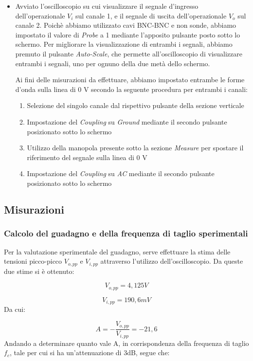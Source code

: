 \begin{itemize}
    \item Avviato l'oscilloscopio su cui visualizzare il segnale d'ingresso dell'operazionale $V_i$ sul canale 1, e il segnale di uscita dell'operazionale $V_o$ sul canale 2.
    Poichè abbiamo utilizzato cavi BNC-BNC e non sonde, abbiamo impostato il valore di \emph{Probe} a 1 mediante l'apposito pulsante posto sotto lo schermo.
    Per migliorare la visualizzazione di entrambi i segnali, abbiamo premuto il pulsante \emph{Auto-Scale}, che permette all'oscilloscopio di visualizzare entrambi i segnali, uno per ognuno della due metà dello schermo.
    
    Ai fini delle misurazioni da effettuare, abbiamo impostato entrambe le forme d'onda sulla linea di 0 V secondo la seguente procedura per entrambi i canali:
    \begin{enumerate}
        \item Selezione del singolo canale dal rispettivo pulsante della sezione verticale
        \item Impostazione del \emph{Coupling} su \textit{Ground} mediante il secondo pulsante posizionato sotto lo schermo
        \item Utilizzo della manopola presente sotto la sezione \textit{Measure} per spostare il riferimento del segnale sulla linea di 0 V
        \item Impostazione del \emph{Coupling} su \textit{AC} mediante il secondo pulsante posizionato sotto lo schermo  
\end{enumerate}
\end{itemize}


\subsection{Misurazioni}
\subsubsection{Calcolo del guadagno e della frequenza di taglio sperimentali}
Per la valutazione sperimentale del guadagno, serve effettuare la stima delle tensioni picco-picco \(V_{o,pp}\)
e \(V_{i, pp}\) attraverso l'utilizzo dell'oscilloscopio. Da queste due stime si è ottenuto:

\[V_{o,pp}=4,125V\]

\[V_{i, pp}=190,6mV\]
Da cui:

\[A=-\frac{V_{o,pp}}{V_{i, pp}}=-21,6\]
Andando a determinare quanto vale A, in corrispondenza della frequenza di taglio \(f_c\), tale per cui si ha un'attenuazione di 3dB, segue che:

